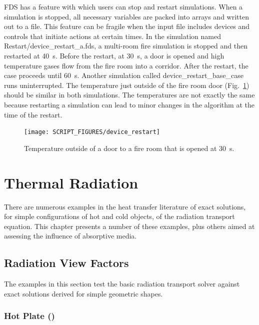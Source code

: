 \documentclass[11pt]{book}
\begin{document}
FDS has a feature with which users can stop and restart simulations. When a simulation is stopped, all necessary variables are packed into arrays and written out to a file. This feature can be fragile when the input file includes devices and controls that initiate actions at certain times. In the simulation named {\ct Restart/device\_restart\_a.fds}, a multi-room fire simulation is stopped and then restarted at 40~s. Before the restart, at 30~s, a door is opened and high temperature gases flow from the fire room into a corridor. After the restart, the case proceeds until 60~s. Another simulation called {\ct device\_restart\_base\_case} runs uninterrupted. The temperature just outside of the fire room door (Fig.~\ref{device_restart_fig}) should be similar in both simulations. The temperatures are not exactly the same because restarting a simulation can lead to minor changes in the algorithm at the time of the restart.

\begin{figure}[!ht]
\centering
\texttt{[image: SCRIPT\_FIGURES/device\_restart]}
\caption[Result of the  test case]{Temperature outside of a door to a fire room that is opened at 30~s.}
\label{device_restart_fig}
\end{figure}


\chapter{Thermal Radiation}

There are numerous examples in the heat transfer literature of exact solutions, for simple configurations of hot and cold objects, of the radiation transport equation. This chapter presents a number of these examples, plus others aimed at assessing the influence of absorptive media.

\section{Radiation View Factors}

The examples in this section test the basic radiation transport solver against exact solutions derived for simple geometric shapes.

\subsection{Hot Plate (\texorpdfstring{}{plate\_view\_factor}) }
\label{plate_view_factor}
\end{document}

